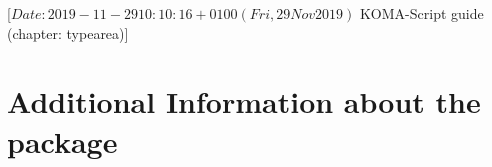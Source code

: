 %
%
%
%
%
%
%
%
% 
%
%
%
%

                 [$Date: 2019-11-29 10:10:16 +0100 (Fri, 29 Nov 2019) $
                  KOMA-Script guide (chapter: typearea)]


\chapter{Additional Information about the  package}
\BeginIndexGroup
{}

